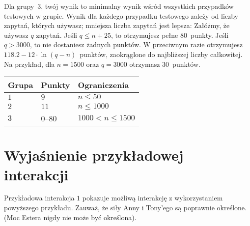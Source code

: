 Dla grupy~$3$, twój wynik to minimalny wynik wśród wszystkich przypadków testowych w grupie.
Wynik dla każdego przypadku testowego zależy od liczby zapytań, których używasz;
mniejsza liczba zapytań jest lepsza:
Załóżmy, że używasz $q$ zapytań. 
Jeśli $q \le n+25$, to otrzymujesz pełne $80$~punkty. 
Jeśli $q > 3000$, to nie dostaniesz żadnych punktów.
W przeciwnym razie otrzymujesz 
$118.2 - 12 \cdot \ln(q - n)$~punktów, zaokrąglone do najbliższej liczby całkowitej. %
Na przykład, dla $n = 1500$ oraz $q = 3000$ otrzymasz $30$~punktów.

\medskip
\begin{tabular}{lll}
Grupa & Punkty & Ograniczenia\\\hline
$1$  &  $9$ & $n\leq 50$\\
$2$  &  $11$ & $n\leq 1000$\\
$3$  &  $0$--$80$ & $1000 < n\leq 1500$\\
\end{tabular}

\section*{Wyjaśnienie przykładowej interakcji}

Przykładowa interakcja $1$ pokazuje możliwą interakcję z wykorzystaniem powyższego przykładu. 
Zauważ, że siły Anny i Tony'ego są poprawnie określone.
(Moc Estera nigdy nie może być określona).
